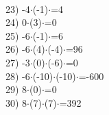 \documentclass[a4paper,10pt]{article}
\begin{document}
\vspace{0.5cm}\\23)   -4$\cdot$(-1)$\cdot$=4
\vspace{0.5cm}\\24)   0$\cdot$(3)$\cdot$=0
\vspace{0.5cm}\\25)   -6$\cdot$(-1)$\cdot$=6
\vspace{0.5cm}\\26)   -6$\cdot$(4)$\cdot$(-4)$\cdot$=96
\vspace{0.5cm}\\27)   -3$\cdot$(0)$\cdot$(-6)$\cdot$=0
\vspace{0.5cm}\\28)   -6$\cdot$(-10)$\cdot$(-10)$\cdot$=-600
\vspace{0.5cm}\\29)   8$\cdot$(0)$\cdot$=0
\vspace{0.5cm}\\30)   8$\cdot$(7)$\cdot$(7)$\cdot$=392
\vspace{0.5cm}\\\pagebreak
\end{document}
